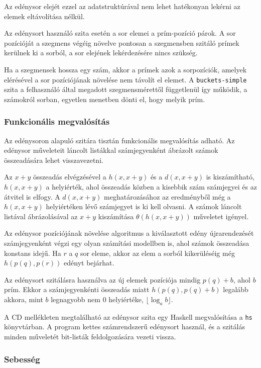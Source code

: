 Az edénysor elejét ezzel az adatstruktúrával nem lehet hatékonyan lekérni az elemek eltávolítása nélkül.

Az edénysort használó szita esetén a sor elemei a prím-pozíció párok.
A sor pozícióját a szegmens végéig növelve pontosan a szegmensben szitáló prímek kerülnek ki a sorból, a sor elejének lekérdezésére nincs szükség.

Ha a szegmensek hossza egy szám, akkor a prímek azok a sorpozíciók, amelyek elérésével a sor pozíciójának növelése nem távolít el elemet.
A \texttt{buckets-simple} szita a felhasználó által megadott szegmensmérettől függetlenül így működik, a számokról sorban, egyetlen menetben dönti el, hogy melyik prím.

\subsubsection{Funkcionális megvalósítás}

Az edénysoron alapuló szitára tisztán funkcionális megvalósítás adható.
Az edénysor műveleteit láncolt listákkal számjegyenként ábrázolt számok összeadására lehet visszavezetni.

Az $x+y$ összeadás elvégzésével a $h(x, x+y)$ és a $d(x, x+y)$ is kiszámítható, $h(x, x+y)$ a helyiérték, ahol összeadás közben a kisebbik szám számjegyei és az átvitel is elfogy. A $d(x, x+y)$ meghatározásához az eredményből még a $h(x, x+y)$ helyiértéken lévő számjegyet is ki kell olvasni.
A számok láncolt listával ábrázolásával az $x+y$ kiszámítása $\theta(h(x, x+y))$ műveletet igényel.

Az edénysor pozíciójának növelése algoritmus a kiválasztott edény újrarendezését számjegyenként végzi egy olyan számítási modellben is, ahol számok összeadása konstans idejű.
Ha $r$ a $q$ sor eleme, akkor az elem a sorból kikerüléséig még $h(p(q), p(r))$ edényt bejárhat.

Az edénysort szitálásra használva az új elemek pozíciója mindig $p(q)+b$, ahol $b$ prím.
Ekkor a számjegyenkénti összeadás miatt $h(p(q), p(q)+b)$ legalább akkora, mint $b$ legnagyobb nem $0$ helyiértéke, $\lfloor \log_{a}{b} \rfloor$.

A CD mellékleten megtalálható az edénysor szita egy Haskell megvalósítása a \texttt{hs} könyvtárban.
A program kettes számrendszerű edénysort használ, és a szitálás minden műveletét bit-listák feldolgozására vezeti vissza.

\subsubsection{Sebesség}

